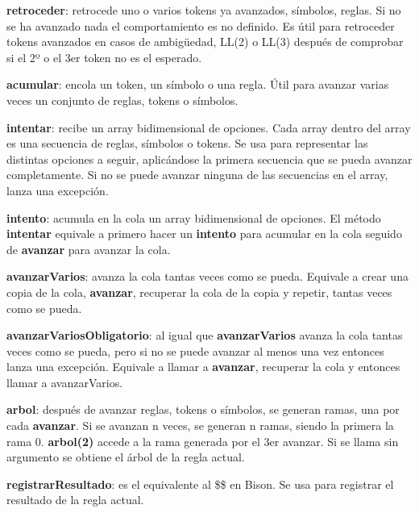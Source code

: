 \documentclass{report}
\begin{document}
	\vspace{10px}
	\noindent
	\textbf{retroceder}: retrocede uno o varios tokens ya avanzados, símbolos, reglas. Si no se ha avanzado nada el comportamiento es no definido. Es útil para retroceder tokens avanzados en casos de ambigüedad, LL(2) o LL(3) después de comprobar si el 2º o el 3er token no es el esperado. 
	
	\vspace{10px}
	\noindent
	\textbf{acumular}: encola un token, un símbolo o una regla. Útil para avanzar varias veces un conjunto de reglas, tokens o símbolos.
	
	\vspace{10px}
	\noindent
	\textbf{intentar}: recibe un array bidimensional de opciones. Cada array dentro del array es una secuencia de reglas, símbolos o tokens. Se usa para representar las distintas opciones a seguir, aplicándose la primera secuencia que se pueda avanzar completamente. Si no se puede avanzar ninguna de las secuencias en el array, lanza una excepción. 
	
	\vspace{10px}
	\noindent
	\textbf{intento}: acumula en la cola un array bidimensional de opciones. El método \textbf{intentar} equivale a primero hacer un \textbf{intento} para acumular en la cola seguido de \textbf{avanzar} para avanzar la cola.
	
	\vspace{10px}
	\noindent
	\textbf{avanzarVarios}: avanza la cola tantas veces como se pueda. Equivale a crear una copia de la cola, \textbf{avanzar}, recuperar la cola de la copia y repetir, tantas veces como se pueda. 
	
	\vspace{10px}
	\noindent
	\textbf{avanzarVariosObligatorio}: al igual que \textbf{avanzarVarios} avanza la cola tantas veces como se pueda, pero si no se puede avanzar al menos una vez entonces lanza una excepción. Equivale a llamar a \textbf{avanzar}, recuperar la cola y entonces llamar a avanzarVarios.
	
	\vspace{10px}
	\textbf{arbol}: después de avanzar reglas, tokens o símbolos, se generan ramas, una por cada \textbf{avanzar}. Si se avanzan n veces, se generan n ramas, siendo la primera la rama 0. \textbf{arbol(2)} accede a la rama generada por el 3er avanzar. Si se llama sin argumento se obtiene el árbol de la regla actual.
	
	\vspace{10px}
	\textbf{registrarResultado}: es el equivalente al \$\$ en Bison. Se usa para registrar el resultado de la regla actual.
	
\end{document}
